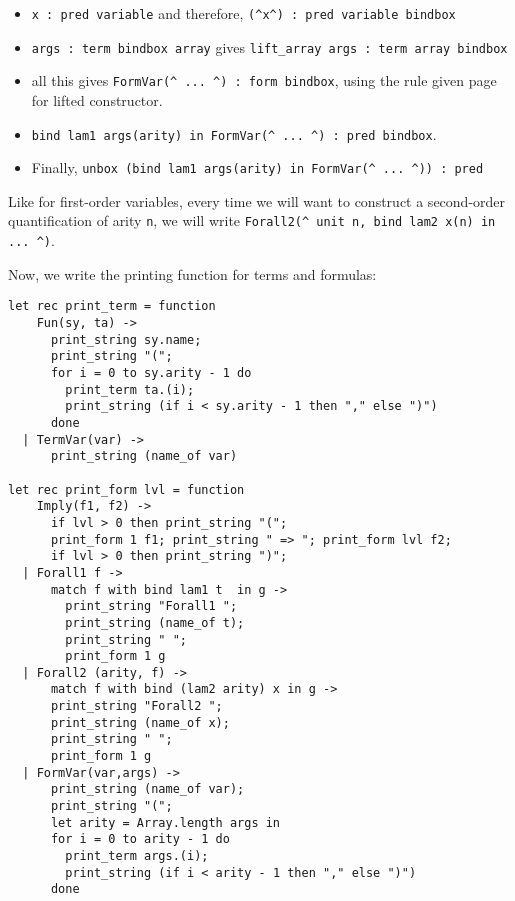 \documentclass[11pt]{article}
\begin{document}
\begin{itemize}
\begin{itemize}
\item \verb#x : pred variable# and therefore,
\verb#(^x^) : pred variable bindbox#
\item \verb#args : term bindbox array# gives
\verb#lift_array args : term array bindbox#
\item all this gives
\verb#FormVar(^ ... ^) : form bindbox#, using the rule given page
\pageref{liftconstr} for lifted constructor.
\item
\verb#bind lam1 args(arity) in FormVar(^ ... ^) : pred bindbox#.
\item Finally, \verb#unbox (bind lam1 args(arity) in FormVar(^ ... ^)) : pred#
\end{itemize}

Like for first-order variables, every time we will want to
construct a second-order quantification of arity \verb#n#, we will write
\verb#Forall2(^ unit n, bind lam2 x(n) in ... ^)#.
\end{itemize}

Now, we write the printing function for terms and formulas:

\begin{verbatim}
let rec print_term = function
    Fun(sy, ta) ->
      print_string sy.name;
      print_string "(";
      for i = 0 to sy.arity - 1 do
        print_term ta.(i);
        print_string (if i < sy.arity - 1 then "," else ")")
      done
  | TermVar(var) ->
      print_string (name_of var)

let rec print_form lvl = function
    Imply(f1, f2) ->
      if lvl > 0 then print_string "(";
      print_form 1 f1; print_string " => "; print_form lvl f2;
      if lvl > 0 then print_string ")";
  | Forall1 f ->
      match f with bind lam1 t  in g ->
        print_string "Forall1 ";
        print_string (name_of t);
        print_string " ";
        print_form 1 g
  | Forall2 (arity, f) ->
      match f with bind (lam2 arity) x in g ->
      print_string "Forall2 ";
      print_string (name_of x);
      print_string " ";
      print_form 1 g
  | FormVar(var,args) ->
      print_string (name_of var);
      print_string "(";
      let arity = Array.length args in
      for i = 0 to arity - 1 do
        print_term args.(i);
        print_string (if i < arity - 1 then "," else ")")
      done
\end{verbatim}
\end{document}
